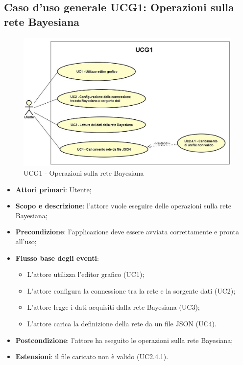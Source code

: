 \newpage
\subsection{Caso d'uso generale UCG1: Operazioni sulla rete Bayesiana}
\begin{figure} [H]
	\centering
	\includegraphics[scale=0.75]{Img/UCG1}
	\caption{UCG1 - Operazioni sulla rete Bayesiana}\label{}
\end{figure}
\begin{itemize} 
	\item{\textbf{Attori primari}: Utente;}
	\item{\textbf{Scopo e descrizione}: l'attore vuole eseguire delle operazioni sulla rete Bayesiana;} 
	\item{\textbf{Precondizione}: l'applicazione deve essere avviata correttamente e pronta all'uso;} 
	\item{\textbf{Flusso base degli eventi}: 
		\begin{itemize} 
			\item{L'attore utilizza l'editor grafico (UC1);} 
			\item{L'attore configura la connessione tra la rete e la sorgente dati (UC2);} 
			\item{L'attore legge i dati acquisiti dalla rete Bayesiana (UC3)}; 
			\item{L'attore carica la definizione della rete da un file JSON (UC4).} 
		\end{itemize} 
	} 
	\item{\textbf{Postcondizione}: l'attore ha eseguito le operazioni sulla rete Bayesiana;} 
	\item{\textbf{Estensioni}: il file caricato non è valido (UC2.4.1).} 
\end{itemize}	

